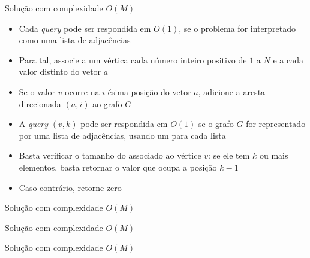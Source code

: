 \begin{frame}[fragile]{Solução com complexidade $O(M)$}

    \begin{itemize}
        \item Cada \textit{query} pode ser respondida em $O(1)$, se o problema for interpretado
            como uma lista de adjacências

        \item Para tal, associe a um vértica cada número inteiro positivo de $1$ a $N$ e a cada 
            valor distinto do vetor $a$

        \item Se o valor $v$ ocorre na $i$-ésima posição do vetor $a$, adicione a aresta
            direcionada $(a, i)$ ao grafo $G$

        \item A \textit{query} $(v, k)$ pode ser respondida em $O(1)$ se o grafo $G$ for 
            representado por uma lista de adjacências, usando um  para cada
            lista

        \item Basta verificar o tamanho do  associado ao vértice $v$: se ele tem 
            $k$ ou mais elementos, basta retornar o valor que ocupa a posição $k - 1$

        \item Caso contrário, retorne zero
   \end{itemize}

\end{frame}

\begin{frame}[fragile]{Solução com complexidade $O(M)$}
\end{frame}

\begin{frame}[fragile]{Solução com complexidade $O(M)$}
\end{frame}

\begin{frame}[fragile]{Solução com complexidade $O(M)$}
\end{frame}
